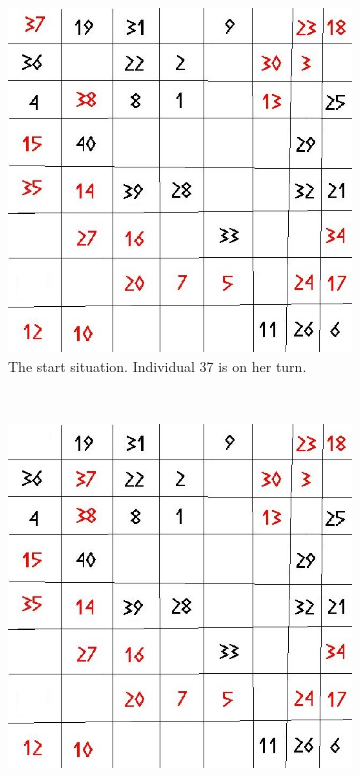 \begin{figure}[H]
    \centering
    \begin{subfigure}{0.3\textwidth}
        \includegraphics[width=\textwidth]{Tegenvoorbeeld/segregation_tegenvb.jpg}
        \caption{The start situation. Individual 37 is on her turn.}
        \label{fig:movement1}
    \end{subfigure}\hspace{1cm}
    ~ %
    \begin{subfigure}{0.3\textwidth}
        \includegraphics[width=\textwidth]{Tegenvoorbeeld/segregation_tegenvb_1.jpg}

\end{subfigure}
\end{figure}
